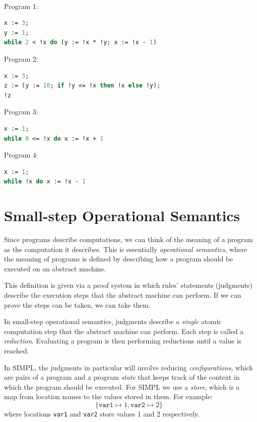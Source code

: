 \begin{eg}~

Program 1:
\begin{lstlisting}[language=OCaml]
x := 3;
y := 1;
while 2 < !x do (y := !x * !y; x := !x - 1)
\end{lstlisting}

Program 2:
\begin{lstlisting}[language=OCaml]
x := 3;
z := (y := 10; if !y <= !x then !x else !y);
!z
\end{lstlisting}

Program 3:
\begin{lstlisting}[language=OCaml]
x := 1;
while 0 <= !x do x := !x + 1
\end{lstlisting}

Program 4:
\begin{lstlisting}[language=OCaml]
x := 1;
while !x do x := !x - 1
\end{lstlisting}
\end{eg}

\section{Small-step Operational Semantics}
Since programs describe computations, we can think of the meaning of a program as the computation it describes. This is essentially \textit{operational semantics}, where the meaning of programs is defined by describing how a program should be executed on an abstract machine. 

This definition is given via a proof system in which rules' statements (judgments) describe the execution steps that the abstract machine can perform. If we can prove the steps can be taken, we can take them. 

In small-step operational semantics, judgments describe a \textit{single} atomic computation step that the abstract machine can perform. Each step is called a \textit{reduction}. Evaluating a program is then performing reductions until a value is reached. 

In SIMPL, the judgments in particular will involve reducing \textit{configurations}, which are pairs of a program and a program \textit{state} that keeps track of the context in which the program should be executed. For SIMPL we use a \textit{store}, which is a map from location names to the values stored in them. For example:
\[
  \{\texttt{var1} \mapsto 1, \texttt{var2} \mapsto 2\}
\]
where locations \texttt{var1} and \texttt{var2} store values 1 and 2 respectively. 


